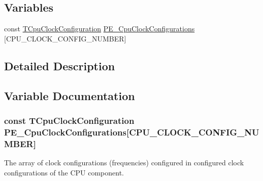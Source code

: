 \subsection*{Variables}
\begin{DoxyCompactItemize}
\item 
const \hyperlink{struct_t_cpu_clock_configuration}{T\+Cpu\+Clock\+Configuration} \hyperlink{group___c_p_u___config__module_gab69281f0e90d16198a5595ed7f471441}{P\+E\+\_\+\+Cpu\+Clock\+Configurations} \mbox{[}C\+P\+U\+\_\+\+C\+L\+O\+C\+K\+\_\+\+C\+O\+N\+F\+I\+G\+\_\+\+N\+U\+M\+B\+ER\mbox{]}
\end{DoxyCompactItemize}


\subsection{Detailed Description}


\subsection{Variable Documentation}
\subsubsection[{\texorpdfstring{P\+E\+\_\+\+Cpu\+Clock\+Configurations}{PE_CpuClockConfigurations}}]{\setlength{\rightskip}{0pt plus 5cm}const {\bf T\+Cpu\+Clock\+Configuration} P\+E\+\_\+\+Cpu\+Clock\+Configurations\mbox{[}C\+P\+U\+\_\+\+C\+L\+O\+C\+K\+\_\+\+C\+O\+N\+F\+I\+G\+\_\+\+N\+U\+M\+B\+ER\mbox{]}}\hypertarget{group___c_p_u___config__module_gab69281f0e90d16198a5595ed7f471441}{}\label{group___c_p_u___config__module_gab69281f0e90d16198a5595ed7f471441}
The array of clock configurations (frequencies) configured in configured clock configurations of the C\+PU component. 